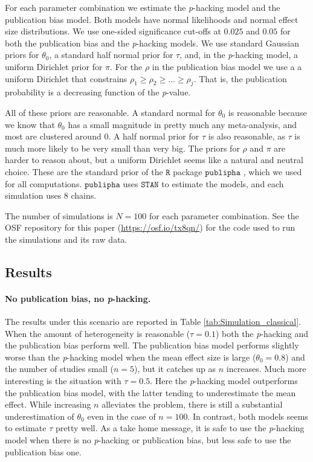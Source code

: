 \documentclass{article}
\theoremstyle{plain}
\theoremstyle{definition}
\begin{document}
For each parameter combination we estimate the \textit{p}-hacking model and the publication bias model. Both models have normal likelihoods and normal effect size distributions. We use one-sided significance cut-offs at $0.025$ and $0.05$ for both the publication bias and the \textit{p}-hacking models. We use standard Gaussian priors for $\theta_0$, a standard half normal prior for $\tau$, and, in the \textit{p}-hacking model, a uniform Dirichlet prior for $\pi$. For the $\rho$ in the publication bias model we use a a uniform Dirichlet that constrains $\rho_{1}\geq\rho_{2}\geq\ldots\geq\rho_{j}$. That is, the publication probability is a decreasing function of the \textit{p}-value.

All of these priors are reasonable. A standard normal for $\theta_0$ is reasonable because we know that $\theta_0$ has a small magnitude in pretty much any meta-analysis, and most are clustered around $0$. A half normal prior for $\tau$ is also reasonable, as $\tau$ is much more likely to be very small than very big. The priors for $\rho$ and $\pi$ are harder to reason about, but a uniform Dirichlet seems like a natural and neutral choice. These are the standard prior of the $\mathtt{R}$ package $\mathtt{publipha}$ \citep{publipha}, which we used for all computations. $\mathtt{publipha}$ uses $\mathtt{STAN}$ \citep{Carpenter2017-cf} to estimate the models, and each simulation uses $8$ chains.

The number of simulations is $N = 100$ for each parameter combination. See the OSF repository for this paper (\url{https://osf.io/tx8qn/}) for the code used to run the simulations and its raw data.

\subsection{Results}
\paragraph{No publication bias, no \textit{p}-hacking.} The results under this scenario are reported in Table \ref{tab:Simulation_classical}. When the amount of heterogeneity is reasonable ($\tau = 0.1$) both the \textit{p}-hacking and the publication bias perform well. The publication bias model performs slightly worse than the \textit{p}-hacking model when the mean effect size is large ($\theta_0 = 0.8$) and the number of studies small ($n=5$), but it catches up as $n$ increases. Much more interesting is the situation with $\tau = 0.5$. Here the \textit{p}-hacking model outperforms the publication bias model, with the latter tending to underestimate the mean effect. While increasing $n$ alleviates the problem, there is still a substantial underestimation of $\theta_0$ even in the case of $n = 100$. In contrast, both models seems to estimate $\tau$ pretty well. As a take home message, it is safe to use the \textit{p}-hacking model when there is no \textit{p}-hacking or publication bias, but less safe to use the publication bias one.
\end{document}

